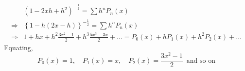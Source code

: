 \documentclass[../main-sheet.tex]{subfiles}
\begin{document}
\begin{rem}
    \begin{align*}
        &\left( 1-2xh+h^2 \right)^{-\frac{1}{2}}=\sum h^nP_n(x)\\
        \Rightarrow & \left\{ 1-h\left( 2x-h \right)\right\}^{-\frac{1}{2}}=\sum h^nP_n(x)\\
        \Rightarrow &1+hx+h^2\frac{3x^2-1}{2}+h^3\frac{5x^3-3x}{2}+\dots=P_0(x)+hP_1(x)+h^2P_2(x)+\dots
    \end{align*}
    Equating,
    \[
        P_0(x)=1,\quad P_1(x)=x,\quad P_2(x)=\frac{3x^2-1}{2}\,\text{ and so on}
    \]
\end{rem}
\end{document}
